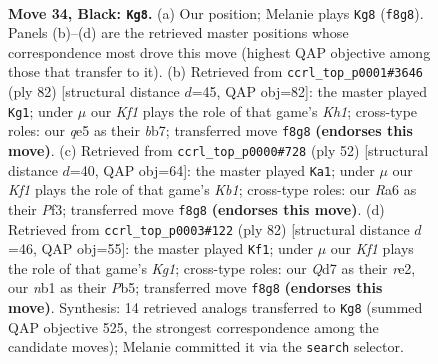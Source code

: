 \documentclass[11pt]{article}
\begin{document}
\clearpage

\begin{figure}[p]\centering
\begin{subfigure}{0.46\textwidth}\centering
\resizebox{\linewidth}{!}{%
\newchessgame
\chessboard[
  setfen={1r3k2/2pq1p2/r7/2p1Q3/2P1P1P1/3P4/7K/1N3R2 b - - 0 34},
  showmover=false,
  pgfstyle=straightmove, color=movearrow, markmove={f8-g8}
]}
\caption{}
\end{subfigure}\hfill
\begin{subfigure}{0.46\textwidth}\centering
\resizebox{\linewidth}{!}{%
\newchessgame
\chessboard[
  setfen={8/1b3k1p/3p1p2/2pP3q/8/1P1QR3/7P/7K w - - 12 42},
  showmover=false,
  pgfstyle=straightmove, color=movearrow, markmove={h1-g1}
]}
\caption{}
\end{subfigure}
\\[4pt]
\begin{subfigure}{0.46\textwidth}\centering
\resizebox{\linewidth}{!}{%
\newchessgame
\chessboard[
  setfen={1r5k/p5p1/3q3p/8/8/P3QP2/1P5P/1K5R w - - 1 27},
  showmover=false,
  pgfstyle=straightmove, color=movearrow, markmove={b1-a1}
]}
\caption{}
\end{subfigure}\hfill
\begin{subfigure}{0.46\textwidth}\centering
\resizebox{\linewidth}{!}{%
\newchessgame
\chessboard[
  setfen={8/3q2k1/1p4p1/1P2p1Q1/8/5PPp/4r2P/2R3K1 w - - 1 42},
  showmover=false,
  pgfstyle=straightmove, color=movearrow, markmove={g1-f1}
]}
\caption{}
\end{subfigure}
\caption{\textbf{Move 34, Black: \texttt{Kg8}.} (a) Our position; Melanie plays \texttt{Kg8} (\texttt{f8g8}). Panels (b)--(d) are the retrieved master positions whose correspondence most drove this move (highest QAP objective among those that transfer to it). (b) Retrieved from \texttt{ccrl\_top\_p0001\#3646} (ply 82) [structural distance $d$=45, QAP obj=82]: the master played \texttt{Kg1}; under $\mu$ our \emph{Kf1} plays the role of that game's \emph{Kh1}; cross-type roles: our \emph{q}e5 as their \emph{b}b7; transferred move \texttt{f8g8} \textbf{(endorses this move)}. (c) Retrieved from \texttt{ccrl\_top\_p0000\#728} (ply 52) [structural distance $d$=40, QAP obj=64]: the master played \texttt{Ka1}; under $\mu$ our \emph{Kf1} plays the role of that game's \emph{Kb1}; cross-type roles: our \emph{R}a6 as their \emph{P}f3; transferred move \texttt{f8g8} \textbf{(endorses this move)}. (d) Retrieved from \texttt{ccrl\_top\_p0003\#122} (ply 82) [structural distance $d$=46, QAP obj=55]: the master played \texttt{Kf1}; under $\mu$ our \emph{Kf1} plays the role of that game's \emph{Kg1}; cross-type roles: our \emph{Q}d7 as their \emph{r}e2, our \emph{n}b1 as their \emph{P}b5; transferred move \texttt{f8g8} \textbf{(endorses this move)}. Synthesis: 14 retrieved analogs transferred to \texttt{Kg8} (summed QAP objective 525, the strongest correspondence among the candidate moves); Melanie committed it via the \texttt{search} selector.}
\label{fig:thought-m67}
\end{figure}
\end{document}
